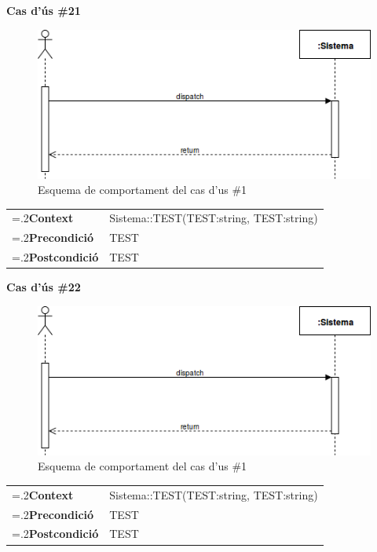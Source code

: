 \clearpage
\noindent\textbf{\large Cas d'ús \#21}\\
\begin{figure}[H]
\centering
\includegraphics[scale=0.6]{Figures/casdus_00.png}
\caption{Esquema de comportament del cas d'us \#1}
\end{figure}
\begin{table}[h]
\noindent
\begin{tabularx}{\linewidth}{
>{\hsize=.2\hsize}X%
>{\hsize=0.8\hsize}X%
}
\textbf{Context} 		& Sistema::TEST(TEST:string, TEST:string) \\
\textbf{Precondició} 	& TEST \\
\textbf{Postcondició}	& TEST \\
\end{tabularx}
\label{}
\end{table}

\noindent\textbf{\large Cas d'ús \#22}\\
\begin{figure}[H]
\centering
\includegraphics[scale=0.6]{Figures/casdus_00.png}
\caption{Esquema de comportament del cas d'us \#1}
\end{figure}
\begin{table}[h]
\noindent
\begin{tabularx}{\linewidth}{
>{\hsize=.2\hsize}X%
>{\hsize=0.8\hsize}X%
}
\textbf{Context} 		& Sistema::TEST(TEST:string, TEST:string) \\
\textbf{Precondició} 	& TEST \\
\textbf{Postcondició}	& TEST \\
\end{tabularx}
\label{}
\end{table}

